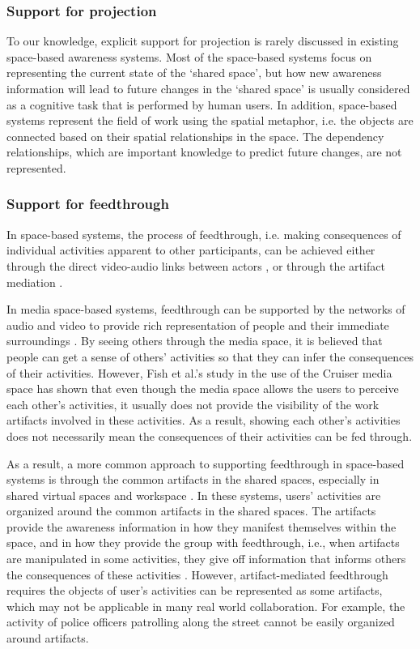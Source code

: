 \subsubsection{Support for projection} %
\label{ssub:support_for_projection}
To our knowledge, explicit support for projection is rarely discussed in existing space-based awareness systems. Most of the space-based systems focus on representing the current state of the `shared space', but how new awareness information will lead to future changes in the `shared space' is usually considered as a cognitive task that is performed by human users. In addition, space-based systems represent the field of work using the spatial metaphor, i.e. the objects are connected based on their spatial relationships in the space. The dependency relationships, which are important knowledge to predict future changes, are not represented.

\subsubsection{Support for feedthrough} %
\label{ssub:support_for_feedthrough}
In space-based systems, the process of feedthrough, i.e. making consequences of individual activities apparent to other participants, can be achieved either through the direct video-audio links between actors \cite{Dourish1992}, or through the artifact mediation \cite{Tee2009}. 

In media space-based systems, feedthrough can be supported by the networks of audio and video to provide rich representation of people and their immediate surroundings \cite{Dourish1992}. By seeing others through the media space, it is believed that people can get a sense of others’ activities so that they can infer the consequences of their activities. However, Fish et al.’s study in the use of the Cruiser media space \cite{Fish1992} has shown that even though the media space allows the users to perceive each other's activities, it usually does not provide the visibility of the work artifacts involved in these activities. As a result, showing each other's activities does not necessarily mean the consequences of their activities can be fed through.

As a result, a more common approach to supporting feedthrough in space-based systems is through the common artifacts in the shared spaces, especially in shared virtual spaces and workspace \cite{Berlage1999}. In these systems, users' activities are organized around the common artifacts in the shared spaces. The artifacts provide the awareness information in how they manifest themselves within the space, and in how they provide the group with feedthrough, i.e., when artifacts are manipulated in some activities, they give off information that informs others the consequences of these activities \cite{Tee2009}. However, artifact-mediated feedthrough requires the objects of user's activities can be represented as some artifacts, which may not be applicable in many real world collaboration. For example, the activity of police officers patrolling along the street cannot be easily organized around artifacts.

